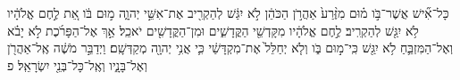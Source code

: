 \documentclass{openreader}
\begin{document}
כָּל־אִ֞ישׁ אֲשֶׁר־בֹּ֣ו מ֗וּם מִזֶּ֨רַע֙ אַהֲרֹ֣ן הַכֹּהֵ֔ן לֹ֣א יִגַּ֔שׁ לְהַקְרִ֖יב אֶת־אִשֵּׁ֣י יְהוָ֑ה מ֣וּם בֹּ֔ו אֵ֚ת לֶ֣חֶם אֱלֹהָ֔יו לֹ֥א יִגַּ֖שׁ לְהַקְרִֽיב׃ 
לֶ֣חֶם אֱלֹהָ֔יו מִקָּדְשֵׁ֖י הַקֳּדָשִׁ֑ים וּמִן־הַקֳּדָשִׁ֖ים יֹאכֵֽל׃ 
אַ֣ךְ אֶל־הַפָּרֹ֜כֶת לֹ֣א יָבֹ֗א וְאֶל־הַמִּזְבֵּ֛חַ לֹ֥א יִגַּ֖שׁ כִּֽי־מ֣וּם בֹּ֑ו וְלֹ֤א יְחַלֵּל֙ אֶת־מִקְדָּשַׁ֔י כִּ֛י אֲנִ֥י יְהוָ֖ה מְקַדְּשָֽׁם׃ 
וַיְדַבֵּ֣ר מֹשֶׁ֔ה אֶֽל־אַהֲרֹ֖ן וְאֶל־בָּנָ֑יו וְאֶֽל־כָּל־בְּנֵ֖י יִשְׂרָאֵֽל׃ פ 
\end{document}
